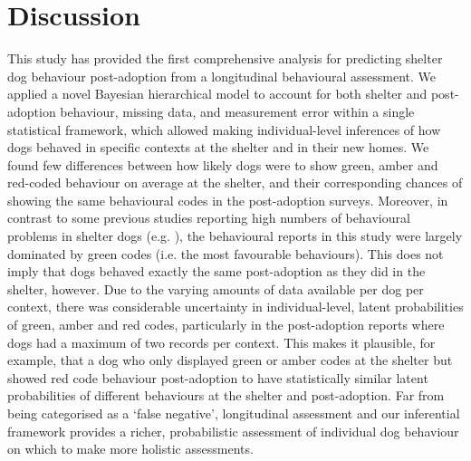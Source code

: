 \documentclass[12pt]{article}
\begin{document}
\section{Discussion}
This study has provided the first comprehensive analysis for predicting shelter dog behaviour post-adoption from a longitudinal behavioural assessment. We applied a novel Bayesian hierarchical model to account for both shelter and post-adoption behaviour, missing data, and measurement error within a single statistical framework, which allowed making individual-level inferences of how dogs behaved in specific contexts at the shelter and in their new homes. We found few differences between how likely dogs were to show green, amber and red-coded behaviour on average at the shelter, and their corresponding chances of showing the same behavioural codes in the post-adoption surveys. Moreover, in contrast to some previous studies reporting high numbers of behavioural problems in shelter dogs (e.g. \cite{gates2018}), the behavioural reports in this study were largely dominated by green codes (i.e. the most favourable behaviours). This does not imply that dogs behaved exactly the same post-adoption as they did in the shelter, however. Due to the varying amounts of data available per dog per context, there was considerable uncertainty in individual-level, latent probabilities of green, amber and red codes, particularly in the post-adoption reports where dogs had a maximum of two records per context. This makes it plausible, for example, that a dog who only displayed green or amber codes at the shelter but showed red code behaviour post-adoption to have statistically similar latent probabilities of different behaviours at the shelter and post-adoption. Far from being categorised as a `false negative', longitudinal assessment and our inferential framework provides a richer, probabilistic assessment of individual dog behaviour on which to make more holistic assessments.
\end{document}
